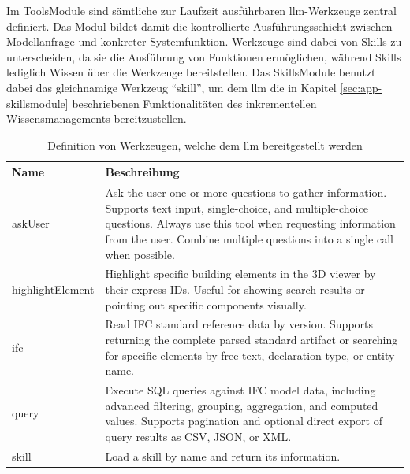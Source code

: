 Im ToolsModule sind sämtliche zur Laufzeit ausführbaren \gls{llm}-Werkzeuge zentral definiert.
Das Modul bildet damit die kontrollierte Ausführungsschicht zwischen Modellanfrage und konkreter Systemfunktion.
Werkzeuge sind dabei von Skills zu unterscheiden, da sie die Ausführung von Funktionen ermöglichen, während Skills lediglich Wissen über die Werkzeuge bereitstellen.
Das SkillsModule benutzt dabei das gleichnamige Werkzeug \enquote{skill}, um dem \gls{llm} die in Kapitel \ref{sec:app-skillsmodule} beschriebenen Funktionalitäten des inkrementellen Wissensmanagements bereitzustellen. \\

\begin{table}[!htb]
    \centering
    \caption[Definition von Werkzeugen]{Definition von Werkzeugen, welche dem \gls{llm} bereitgestellt werden}
    \label{tab:103_available-tools}
    \begin{tabular}{C{3.5cm} L{9.5cm}}
        \hline
        \textbf{Name} & \textbf{Beschreibung} \\
        \hline

        askUser & Ask the user one or more questions to gather information. Supports text input, single-choice, and multiple-choice questions. Always use this tool when requesting information from the user. Combine multiple questions into a single call when possible. \\

        highlightElement & Highlight specific building elements in the 3D viewer by their express IDs. Useful for showing search results or pointing out specific components visually. \\

        ifc & Read IFC standard reference data by version. Supports returning the complete parsed standard artifact or searching for specific elements by free text, declaration type, or entity name. \\

        query & Execute SQL queries against IFC model data, including advanced filtering, grouping, aggregation, and computed values. Supports pagination and optional direct export of query results as CSV, JSON, or XML. \\

        skill & Load a skill by name and return its information. \\

        \hline
    \end{tabular}
\end{table}

